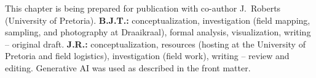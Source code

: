 \begin{chaptercredit}
This chapter is being prepared for publication with co-author J.\ Roberts
(University of Pretoria).
\textbf{B.J.T.:} conceptualization, investigation (field mapping, sampling, and
photography at Draaikraal), formal analysis, visualization, writing -- original draft.
\textbf{J.R.:} conceptualization, resources (hosting at the University of Pretoria and
field logistics), investigation (field work), writing -- review and editing.
Generative AI was used as described in the front matter.
\end{chaptercredit}
